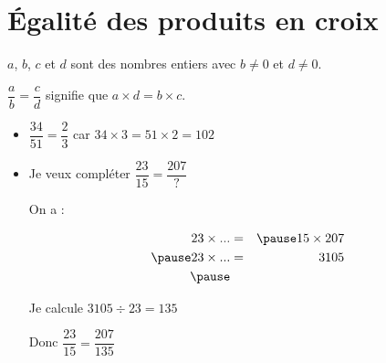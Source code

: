 \documentclass[xcolor={dvipsnames}]{beamer}
\begin{document}
\section{\'Egalité des produits en croix}

\begin{frame}
	\begin{myprop}
		$a$, $b$, $c$ et $d$  sont des nombres entiers \pause avec $b \neq 0$ et $ d \neq 0$.\pause
		
		$\dfrac{a}{b} = \dfrac{c}{d}$ signifie que \pause $a \times d = b \times c$.\pause
		
		
	\end{myprop}
	
	
	\begin{myexs}
		\begin{itemize}
			\item $\dfrac{34}{51} = \dfrac{2}{3}$ \pause car $34 \times 3 = 51 \times 2 = 102$ \pause
			
			\item Je veux compléter $\dfrac{23}{15} = \dfrac{207}{?}$ \pause
			
			On a :\pause
			
			\vspace*{-1cm}
			\begin{eqnarray*}
				23 \times ... &=& \pause 15 \times 207 \\ \pause
				23 \times ... &=& \num{3105} \\ \pause
			\end{eqnarray*}
			\vspace*{-1cm}
			
			Je calcule $\num{3105} \div 23 = 135$ \pause
			
			Donc $\dfrac{23}{15} = \dfrac{207}{135}$ 
		\end{itemize}
		
	\end{myexs}
\end{frame}
\end{document}
